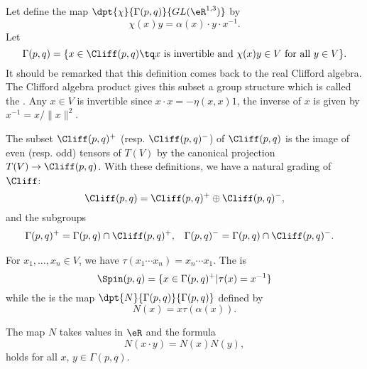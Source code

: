 Let define the map $\dpt{\chi}{\Gamma(p,q)}{GL(\eR^{1,3})}$ by
\begin{equation}
                \chi(x)y=\alpha(x)\cdot y\cdot x^{-1}.
\end{equation}
Let
\[
 \Gamma(p,q)=\{x\in\Cliff(p,q)\tq\textrm{$x$ is invertible and }  \chi(x)y  \in V\textrm{ for all $y\in V$}\}.
\]
It should be remarked that this definition comes back to the real Clifford algebra. The Clifford algebra product gives this subset a group structure which is called the . Any $x\in V$ is invertible since $x\cdot x=-\eta(x,x)1$, the inverse of $x$ is given by $x^{-1}=x/\|x\|^2$.

The subset $\Cliff(p,q)^+$ (resp. $\Cliff(p,q)^-$) of $\Cliff(p,q)$ is the image of even (resp. odd) tensors of $T(V)$ by the canonical projection $T(V)\to\Cliff(p,q)$. With these definitions, we have a natural grading of $\Cliff$:
\begin{equation}
 \label{directC}\Cliff(p,q)=\Cliff(p,q)^+\oplus\Cliff(p,q)^-,
 \end{equation}
and the subgroups
\begin{align}
\label{defgplus}
\Gamma(p,q)^+&=\Gamma(p,q)\cap\Cliff(p,q)^+,&\Gamma(p,q)^-&=\Gamma(p,q)\cap\Cliff(p,q)^-.
\end{align}

For $x_1,\ldots,x_n\in V$, we have $\tau(x_1\cdots x_n)=x_n\cdots x_1$.  The  is
\begin{equation}   \label{defSpinun}
 \Spin(p,q)=\{x\in\Gamma(p,q)^+\vert\tau(x)=x^{-1}\}
\end{equation}
while the  is the map $\dpt{N}{\Gamma(p,q)}{\Gamma(p,q)}$ defined by
\[
 N(x)=x\tau(\alpha(x)).
\]

\begin{proposition} \label{proppourN}
The map $N$ takes values in $\eR$ and the formula
\begin{equation}
             N(x\cdot y)=N(x)N(y),
\end{equation}
holds for all $x$, $y\in\Gamma(p,q)$.
\end{proposition}

